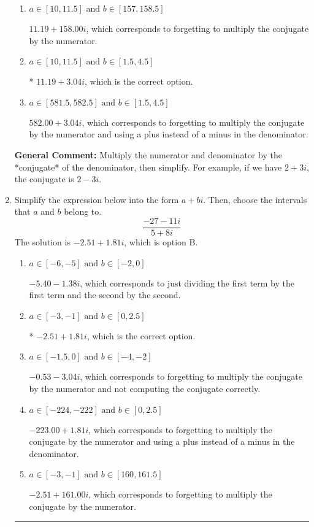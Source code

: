 \documentclass{extbook}[14pt]
\newcommand{\litem}[1]{\item #1

\rule{\textwidth}{0.4pt}}
\begin{document}
\begin{enumerate}
{\begin{enumerate}[label=\Alph*.]
 $-1.50  - 11.50 i$, which corresponds to forgetting to multiply the conjugate by the numerator and not computing the conjugate correctly.
\item \( a \in [10, 11.5] \text{ and } b \in [157, 158.5] \)

 $11.19  + 158.00 i$, which corresponds to forgetting to multiply the conjugate by the numerator.
\item \( a \in [10, 11.5] \text{ and } b \in [1.5, 4.5] \)

* $11.19  + 3.04 i$, which is the correct option.
\item \( a \in [581.5, 582.5] \text{ and } b \in [1.5, 4.5] \)

 $582.00  + 3.04 i$, which corresponds to forgetting to multiply the conjugate by the numerator and using a plus instead of a minus in the denominator.
\end{enumerate}

\textbf{General Comment:} Multiply the numerator and denominator by the *conjugate* of the denominator, then simplify. For example, if we have $2+3i$, the conjugate is $2-3i$.
}
\litem{
Simplify the expression below into the form $a+bi$. Then, choose the intervals that $a$ and $b$ belong to.
\[ \frac{-27 - 11 i}{5 + 8 i} \]The solution is \( -2.51  + 1.81 i \), which is option B.\begin{enumerate}[label=\Alph*.]
\item \( a \in [-6, -5] \text{ and } b \in [-2, 0] \)

 $-5.40  - 1.38 i$, which corresponds to just dividing the first term by the first term and the second by the second.
\item \( a \in [-3, -1] \text{ and } b \in [0, 2.5] \)

* $-2.51  + 1.81 i$, which is the correct option.
\item \( a \in [-1.5, 0] \text{ and } b \in [-4, -2] \)

 $-0.53  - 3.04 i$, which corresponds to forgetting to multiply the conjugate by the numerator and not computing the conjugate correctly.
\item \( a \in [-224, -222] \text{ and } b \in [0, 2.5] \)

 $-223.00  + 1.81 i$, which corresponds to forgetting to multiply the conjugate by the numerator and using a plus instead of a minus in the denominator.
\item \( a \in [-3, -1] \text{ and } b \in [160, 161.5] \)

 $-2.51  + 161.00 i$, which corresponds to forgetting to multiply the conjugate by the numerator.
\end{enumerate}

}
\end{enumerate}
\end{document}
